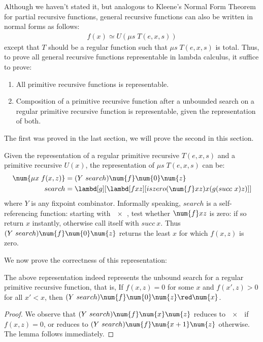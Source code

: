 \documentclass[../../../include/open-logic-section]{subfiles}
\begin{document}

Although we haven't stated it, but analogous to Kleene's Normal Form
Theorem for partial recursive functions, general recursive functions
can also be written in normal forms as follows:
\begin{align*}
  f(x) \simeq U(\mu s \; T(e,x,s))
\end{align*}
except that $T$ should be a regular function such that $\mu s \; T(e,x,s)$
is total. Thus, to prove all general recursive functions
representable in lambda calculus, it suffice to prove:

\begin{enumerate}
\item All primitive recursive functions is representable.
\item Composition of a primitive recursive function after a
  unbounded search on a regular primitive recursive function
  is representable, given the representation of both.
\end{enumerate}

The first was proved in the last section, we will prove the second in
this section.

Given the representation of a regular primitive recursive
$T(e,x,s)$ and a primitive recursive $U(x)$, the representation of
$\mu s \; T(e,x,s)$ can be:
\begin{align*}
  \num{\mu x \; f(x,z)} &= (Y ~ search) \num{f} \num{0} \num{z} \\
  search &= \lambd[g][\lambd[fxz][iszero (\num{f} x z) x (g (succ ~ x)
           z)]]
\end{align*}
where $Y$ is any fixpoint combinator. Informally speaking, $search$ is
a self-referencing function: starting with $\num{x}$, test whether $\num{f} x
z$ is zero: if so return $x$ instantly, otherwise call itself
with $succ ~ x$. Thus $(Y ~ search) \num{f} \num{0} \num{z}$ returns
the least $x$ for which $f(x,z)$ is zero.

We now prove the correctness of this representation:
\begin{lem}
  The above representation indeed represents the unbound search for
  a regular primitive recursive function, that is,
  If $f(x,z) = 0$ for some $x$ and $f(x',z) > 0$ for all $x' < x$,
    then $(Y ~ search) \num{f} \num{0} \num{z} \red \num{x}$.
\end{lem}
\begin{proof}
  We observe that $(Y ~ search) \num{f} \num{x} \num{z}$ reduces to $\num{x}$ if
  $f(x,z)=0$, or reduces to $(Y ~ search) \num{f} \num{x+1} \num{z}$
  otherwise. The lemma follows immediately.
\end{proof}
\end{document}
